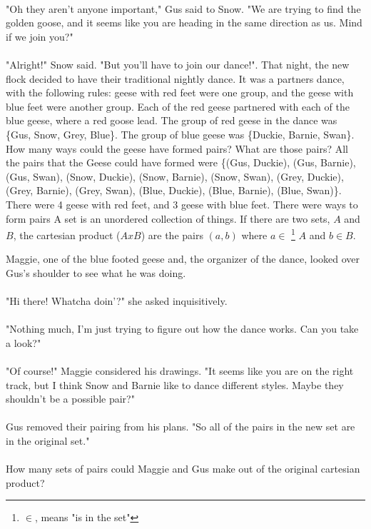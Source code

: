 \paragraph{} "Oh they aren't anyone important," Gus said to Snow. "We are trying to find the golden goose, and it seems like you are heading in the same direction as us. Mind if we join you?"
\paragraph{} "Alright!" Snow said. "But you'll have to join our dance!".
\vfill
\pagebreak
{}
{That night, the new flock decided to have their traditional nightly dance. It was a partners dance, with the following rules: geese with red feet were one group, and the geese with blue feet were another group. Each of the red geese partnered with each of the blue geese, where a red goose lead. The group of red geese in the dance was \{Gus, Snow, Grey, Blue\}. The group of blue geese was \{Duckie, Barnie, Swan\}. How many ways could the geese have formed pairs? What are those pairs?}
{All the pairs that the Geese could have formed were \{(Gus, Duckie), (Gus, Barnie), (Gus, Swan), (Snow, Duckie), (Snow, Barnie), (Snow, Swan), (Grey, Duckie), (Grey, Barnie), (Grey, Swan), (Blue, Duckie), (Blue, Barnie), (Blue, Swan)\}. There were 4 geese with red feet, and 3 geese with blue feet. There were  ways to form pairs}
{A set is an unordered collection of things. If there are two sets, $A$ and $B$, the cartesian product ($AxB$) are the pairs $(a, b)$ where $a\in$ \footnote{$\in$, means "is in the set"} $A$ and $b\in B$.}
{}
{Maggie, one of the blue footed geese and, the organizer of the dance, looked over Gus's shoulder to see what he was doing. \paragraph{} "Hi there! Whatcha doin'?" she asked inquisitively.
\paragraph{} "Nothing much, I'm just trying to figure out how the dance works. Can you take a look?"
\paragraph{} "Of course!" Maggie considered his drawings. "It seems like you are on the right track, but I think Snow and Barnie like to dance different styles. Maybe they shouldn't be a possible pair?"
\paragraph{} Gus removed their pairing from his plans. "So all of the pairs in the new set are in the original set."
\paragraph{} How many sets of pairs could Maggie and Gus make out of the original cartesian product?}
